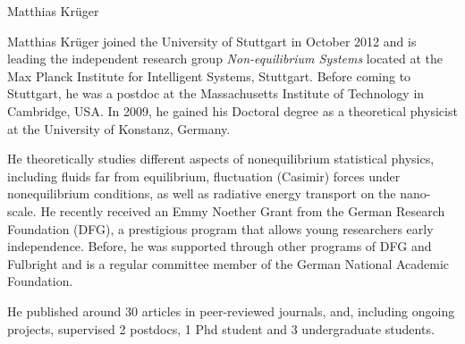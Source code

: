 \begin{participant}[type=leadPI,PM=12,gender=male,salary=5500]{Matthias Krüger}

Matthias Krüger joined the University of Stuttgart in October 2012 and is leading the
independent research group {\it Non-equilibrium Systems} located at the Max Planck Institute
for Intelligent Systems, Stuttgart. Before coming to Stuttgart, he was a postdoc at the
Massachusetts Institute of Technology in Cambridge, USA.  In 2009, he gained his Doctoral
degree as a theoretical physicist at the University of Konstanz, Germany.

He theoretically studies different aspects of nonequilibrium statistical physics, including
fluids far from equilibrium, fluctuation (Casimir) forces under nonequilibrium conditions,
as well as radiative energy transport on the nano-scale.
%
He recently received an Emmy Noether Grant from the German Research Foundation (DFG), a
prestigious program that allows young researchers early independence.  Before, he was
supported through other programs of DFG and Fulbright and is a regular committee member of
the German National Academic Foundation.

He published around 30 articles in peer-reviewed journals, and, including ongoing projects, supervised 2 postdocs, 1 Phd student and 3 undergraduate students.

\end{participant}